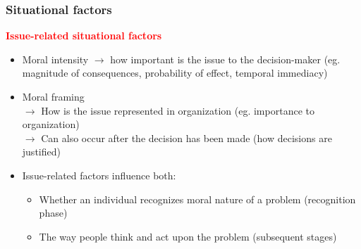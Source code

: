 \documentclass{article}
\DeclareRobustCommand{\k}[1]{\textcolor{red}{#1}}
\begin{document}
\subsubsection{Situational factors}
\k{\textbf{Issue-related situational factors}}
\begin{itemize}
    \item Moral intensity $\to$ how important is the issue to the decision-maker (eg. magnitude of consequences, probability of effect, temporal immediacy)
    \item Moral framing\\
    $\to$ How is the issue represented in organization (eg. importance to organization)\\
    $\to$ Can also occur after the decision has been made (how decisions are justified)
    \item Issue-related factors influence both:
    \begin{itemize}[label=$\to$]
        \item Whether an individual recognizes moral nature of a problem (recognition phase)
        \item The way people think and act upon the problem (subsequent stages)
    \end{itemize}
\end{itemize}
\end{document}
